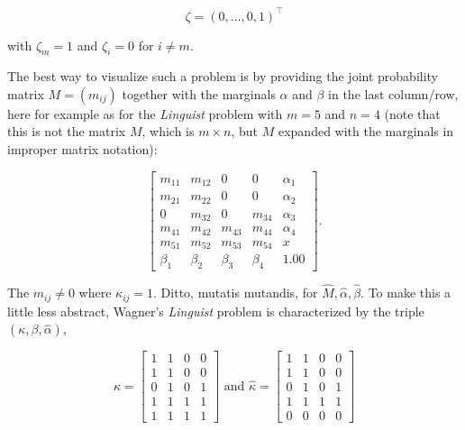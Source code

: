 \begin{equation}
\label{eq:zeta}
\zeta=(0,\ldots,0,1)^{\intercal}
\end{equation}

{\noindent}with $\zeta_{m}=1$ and $\zeta_{i}=0$ for $i\neq{}m$.

The best way to visualize such a problem is by providing the joint
probability matrix $M=(m_{ij})$ together with the marginals $\alpha$
and $\beta$ in the last column/row, here for example as for the
\emph{Linguist} problem with $m=5$ and $n=4$ (note that this is not
the matrix $M$, which is $m\times{}n$, but $M$ expanded with the
marginals in improper matrix notation):

\begin{equation}
  \label{eq:m3}
      \left[
      \begin{array}{ccccc}
        m_{11} & m_{12} & 0 & 0 & \alpha_{1} \\
        m_{21} & m_{22} & 0 & 0 & \alpha_{2} \\
        0 & m_{32} & 0 & m_{34} & \alpha_{3} \\
        m_{41} & m_{42} & m_{43} & m_{44} & \alpha_{4} \\
        m_{51} & m_{52} & m_{53} & m_{54} & x \\
        \beta_{1} & \beta_{2} & \beta_{3} & \beta_{4} & 1.00
      \end{array}
\right].
\end{equation}

{\noindent}The $m_{ij}\neq{}0$ where $\kappa_{ij}=1$. Ditto, mutatis mutandis,
for $\hat{M},\hat{\alpha},\hat{\beta}$. To make this a little less
abstract, Wagner's \emph{Linguist} problem is characterized by the
triple $(\kappa,\beta,\hat{\alpha})$,

\begin{equation}
  \label{eq:m4}
  \kappa=\left[
  \begin{array}{cccc}
    1 & 1 & 0 & 0 \\
    1 & 1 & 0 & 0 \\
    0 & 1 & 0 & 1 \\
    1 & 1 & 1 & 1 \\
    1 & 1 & 1 & 1
  \end{array}
\right]\mbox{ and }
  \hat{\kappa}=\left[
  \begin{array}{cccc}
    1 & 1 & 0 & 0 \\
    1 & 1 & 0 & 0 \\
    0 & 1 & 0 & 1 \\
    1 & 1 & 1 & 1 \\
    0 & 0 & 0 & 0
  \end{array}
\right]
\end{equation}

